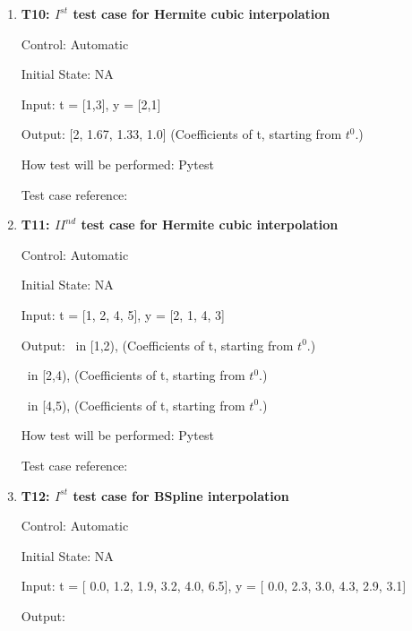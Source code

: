 \documentclass[12pt, titlepage]{article}
\begin{document}
\begin{enumerate}

\item{\textbf{T10: $I^{st}$ test case for Hermite cubic interpolation }\\}

Control: Automatic 

Initial State: NA

Input: t = [1,3], y = [2,1]

Output: [2, 1.67, 1.33, 1.0] (Coefficients of t, starting from $t^{0}$.)


How test will be performed: Pytest

Test case reference: \cite{HermiteCubic} \\

\item{\textbf{T11: ${II}^{nd}$ test case for Hermite  
cubic 
interpolation} \\}

Control: Automatic 

Initial State: NA

Input: t = [1, 2, 4, 5], y = [2, 1, 4, 3]

Output: 
~\newline [1.0,1.0, 1.38888889, 2.0] in [1,2), (Coefficients of t, starting from $t^{0}$.)

~\newline [4.0, 4.0, 1.0, 1.0] in [2,4), (Coefficients of t, starting from $t^{0}$.)

~\newline[3.0, 3.61111111, 4.0, 4.0] in [4,5), (Coefficients of t, starting from $t^{0}$.)

How test will be performed: Pytest

Test case reference: \cite{HermiteCubic2}\\

\item{\textbf{T12: $I^{st}$ test case for BSpline interpolation} \\}

Control: Automatic 

Initial State: NA

Input: t = [ 0.0, 1.2,  1.9,  3.2,  4.0,  6.5], y = [ 0.0,  2.3,  3.0,  4.3,  
2.9,  3.1]


Output: 
~\newline [0, 2.987, -0.574, 14.670,-10.325, 3.1, 0, 0, 0, 0, 0]


\end{enumerate}
\end{document}

